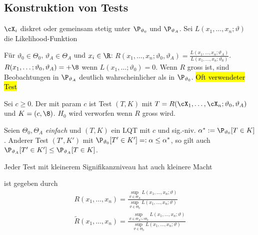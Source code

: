 \newpage
\subsection{Konstruktion von Tests}
$\cX_i$ diskret oder gemeinsam stetig unter $\P_{\vartheta_0}$ und $\P_{\vartheta_A}$. Sei $L(x_1, \ldots, x_n; \vartheta)$ die Likelihood-Funktion

 Für $\vartheta_0 \in \Theta_0$, $\vartheta_A \in \Theta_A$ und $x_i \in \R$:
$R(x_1, \ldots, x_n; \vartheta_0, \vartheta_A) = \frac{L(x_1, \ldots, x_n; \vartheta_A)}{L(x_1, \ldots, x_n; \vartheta_0)}$.\\
$R(x_1, \ldots; \vartheta_0, \vartheta_A) = +\8$ wenn $L(x_1, \ldots; \vartheta_0) = 0$.
Wenn $R$ gross ist, sind Beobachtungen in $\P_{\vartheta_A}$ deutlich wahrscheinlicher als in $\P_{\vartheta_0}$.
\hl{Oft verwendeter Test}

 Sei $c \geq 0$. Der  mit param $c$ ist Test $(T, K)$ mit $T = R(\cX_1, \ldots, \cX_n; \vartheta_0, \vartheta_A)$
und $K = (c, \8)$. $H_0$ wird verworfen wenn $R$ gross wird.


 Seien $\Theta_0, \Theta_A$ \textit{einfach} und $(T, K)$ ein LQT mit $c$ und sig.-niv. $\alpha^* := \P_{\vartheta_0}[T \in K]$.
Anderer Test $(T', K')$ mit $\P_{\vartheta_0}[T' \in K'] =: \alpha \leq \alpha^*$, so gilt auch $\P_{\vartheta_A}[T' \in K'] \leq \P_{\vartheta_A}[T \in K]$.

\inlineintuition Jeder Test mit kleinerem Signifikanzniveau hat auch kleinere Macht

\shortdefinition[Verallgemeinerte LQ] ist gegeben durch
\begin{align*}
    R(x_1, \ldots, x_n) = \frac{\sup_{\vartheta \in \Theta_A} L(x_1, \ldots, x_n; \vartheta)}{\sup_{\vartheta \in \Theta_0} L(x_1, \ldots, x_n; \vartheta)} \\
    \tilde{R}(x_1, \ldots, x_n) = \frac{\sup_{\vartheta \in \Theta_A \cup \Theta_0} L(x_1, \ldots, x_n; \vartheta)}{\sup_{\vartheta \in \Theta_0} L(x_1, \ldots, x_n; \vartheta)}
\end{align*}

